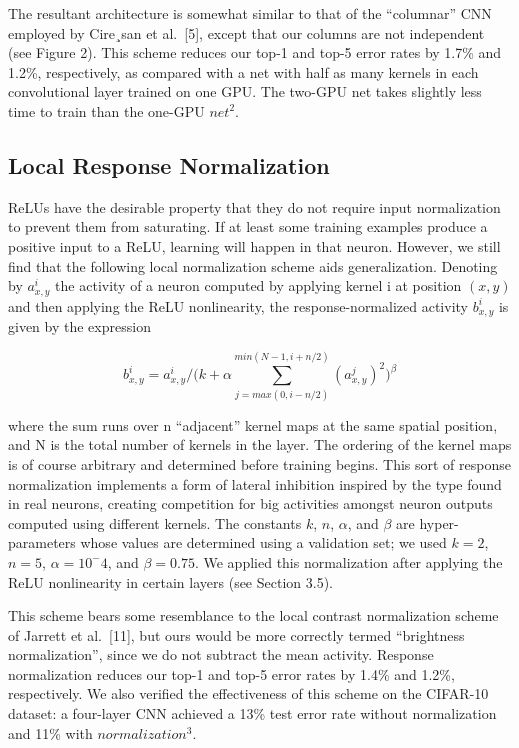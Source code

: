 \documentclass[12pt,a4paper,UTF8,twoside]{book}
\begin{document}
The resultant architecture is somewhat similar to that of the ``columnar'' CNN employed by Cire¸san et al.~{[}5{]}, except that our columns are not independent (see Figure 2). This scheme reduces our top-1 and top-5 error rates by 1.7\% and 1.2\%, respectively, as compared with a net with half as many kernels in each convolutional layer trained on one GPU. The two-GPU net takes slightly less time to train than the one-GPU \(net^2\).

\hypertarget{local-response-normalization}{%
\subsection{Local Response Normalization}\label{local-response-normalization}}

ReLUs have the desirable property that they do not require input normalization to prevent them from saturating. If at least some training examples produce a positive input to a ReLU, learning will happen in that neuron. However, we still find that the following local normalization scheme aids generalization. Denoting by \(a^i_{x,y}\) the activity of a neuron computed by applying kernel i at position \((x, y)\) and then applying the ReLU nonlinearity, the response-normalized activity \(b^i_{x,y}\) is given by the expression

\[b^i_{x,y} = a^i_{x,y}/\bigg(k+\alpha\sum\limits_{j=max(0,i-n/2)}^{min(N-1,i+n/2)}(a_{x,y}^j)^2\bigg)^\beta\]

where the sum runs over n ``adjacent'' kernel maps at the same spatial position, and N is the total number of kernels in the layer. The ordering of the kernel maps is of course arbitrary and determined before training begins. This sort of response normalization implements a form of lateral inhibition inspired by the type found in real neurons, creating competition for big activities amongst neuron outputs computed using different kernels. The constants \(k\), \(n\), \(\alpha\), and \(\beta\) are hyper-parameters whose values are determined using a validation set; we used \(k = 2\), \(n = 5\), \(\alpha = 10^−4\), and \(\beta = 0.75\). We applied this normalization after applying the ReLU nonlinearity in certain layers (see Section 3.5).

This scheme bears some resemblance to the local contrast normalization scheme of Jarrett et al.~{[}11{]}, but ours would be more correctly termed ``brightness normalization'', since we do not subtract the mean activity. Response normalization reduces our top-1 and top-5 error rates by 1.4\% and 1.2\%, respectively. We also verified the effectiveness of this scheme on the CIFAR-10 dataset: a four-layer CNN achieved a 13\% test error rate without normalization and 11\% with \(normalization^3\).
\end{document}
